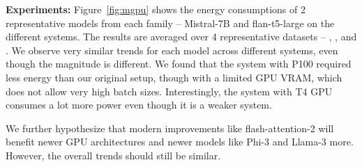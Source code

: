 \noindent \textbf{Experiments:}
Figure~\ref{fig:mgpu} shows the energy consumptions of 2 representative models from each family -- Mistral-7B and flan-t5-large on the different systems. The results are averaged over 4 representative datasets -- \boolq , \mnli, \cnndm and \squad.
We observe very similar trends for each model across different systems, even though the magnitude is different. We found that the system with P100 required less energy than our original setup, though with a limited GPU VRAM, which does not allow very high batch sizes. Interestingly, the system with T4 GPU consumes a lot more power even though it is a weaker system.  

We further hypothesize that modern improvements like flash-attention-2 will benefit newer GPU architectures and newer models like Phi-3 and Llama-3 more. However, the overall trends should still be similar.








